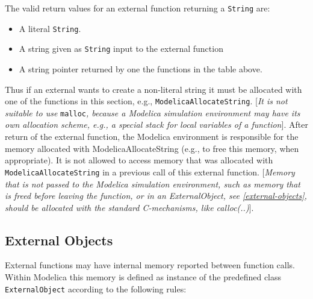 The valid return values for an external function returning a \lstinline!String! are:
\begin{itemize}
\item A literal \lstinline!String!.
\item A string given as \lstinline!String! input to the external function
\item A string pointer returned by one the functions in the table above.
\end{itemize}

Thus if an external wants to create a non-literal string it must be allocated with one of the functions in
this section, e.g., \lstinline!ModelicaAllocateString!.
{[}\emph{It is not suitable to use} \lstinline!malloc!\emph{, because a Modelica simulation environment may have
its own allocation scheme, e.g., a special stack for local variables of
a function}{]}. After return of the external function, the Modelica
environment is responsible for the memory allocated with
ModelicaAllocateString (e.g., to free this memory, when appropriate). It
is not allowed to access memory that was allocated with
\lstinline!ModelicaAllocateString! in a previous call of this external function.
{[}\emph{Memory that is not passed to the Modelica simulation
environment, such as memory that is freed before leaving the function,
or in an ExternalObject, see \autoref{external-objects}, should be allocated
with the standard C-mechanisms, like calloc(..)}{]}.

\subsection{External Objects}

External functions may have internal memory reported between function
calls. Within Modelica this memory is defined as instance of the
predefined class \lstinline!ExternalObject! according to the following rules:

